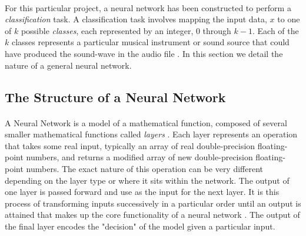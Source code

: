 \documentclass[12pt,letterpaper]{article}
\begin{document}
\paragraph*{}For this particular project, a neural network has been constructed to perform a \textit{classification} task. A classification task involves mapping the input data, $x$ to one of $k$ possible \textit{classes}, each represented by an integer, $0$ through $k-1$. Each of the $k$ classes represents a particular musical instrument or sound source that could have produced the sound-wave in the audio file \cite{Goodfellow,Loy,Virtanen}. In this section we detail the nature of a general neural network. 


\subsection{The Structure of a Neural Network}
\label{subsec-NetworkStructure}

\paragraph*{}A Neural Network is a model of a mathematical function, composed of several smaller mathematical functions called \textit{layers} \cite{Goodfellow,Loy}. Each layer represents an operation that takes some real input, typically an array of real double-precision floating-point numbers, and returns a modified array of new double-precision floating-point numbers. The exact nature of this operation can be very different depending on the layer type or where it sits within the network. The output of one layer is passed forward and use as the input for the next layer. It is this process of transforming inputs successively in a particular order until an output is attained that makes up the core functionality of a neural network \cite{Geron,Loy}. The output of the final layer encodes the "decision" of the model given a particular input.
\end{document}
